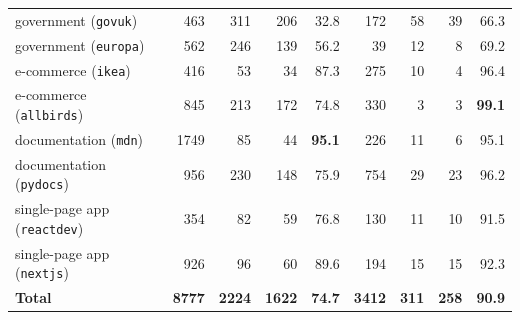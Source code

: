 \begin{table}[htbp]
\begin{tabular}{@{}l rrrr rrrr@{}}
		\addlinespace
		government (\texttt{govuk})         & 463                                       & 311                                       & 206                 & \num{32.8}          & 172                 & 58           & 39           & \num{66.3}          \\
		government (\texttt{europa})        & 562                                       & 246                                       & 139                 & \num{56.2}          & 39                  & 12           & 8            & \num{69.2}          \\
		\addlinespace
		e-commerce (\texttt{ikea})          & 416                                       & 53                                        & 34                  & \num{87.3}          & 275                 & 10           & 4            & \num{96.4}          \\
		e-commerce (\texttt{allbirds})      & 845                                       & 213                                       & 172                 & \num{74.8}          & 330                 & 3            & 3            & \textbf{\num{99.1}} \\
		\addlinespace
		documentation (\texttt{mdn})        & \num{1749}                                & 85                                        & 44                  & \textbf{\num{95.1}} & 226                 & 11           & 6            & \num{95.1}          \\
		documentation (\texttt{pydocs})     & 956                                       & 230                                       & 148                 & \num{75.9}          & 754                 & 29           & 23           & \num{96.2}          \\
		\addlinespace
		single-page app (\texttt{reactdev}) & 354                                       & 82                                        & 59                  & \num{76.8}          & 130                 & 11           & 10           & \num{91.5}          \\
		single-page app (\texttt{nextjs})   & 926                                       & 96                                        & 60                  & \num{89.6}          & 194                 & 15           & 15           & \num{92.3}          \\
		\midrule
		\textbf{Total}                      & \textbf{\num{8777}}                       & \textbf{\num{2224}}                       & \textbf{\num{1622}} & \textbf{\num{74.7}} & \textbf{\num{3412}} & \textbf{311} & \textbf{258} & \textbf{\num{90.9}} \\

\end{tabular}
\end{table}
